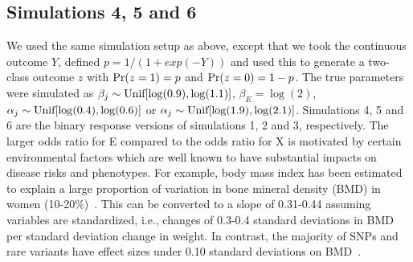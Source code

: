 \begin{comment}
\begin{figure}[h!]
	\centering
	\texttt{[image: figure4.eps]}
	\caption{Visualization of the relationship between the response, the first principal component of the main effects and $f(Q_i)$ in~\eqref{eq:sim3} for $E=0$ (left) and $E=1$ (right) in simulation scenario 3. This graphic also depicts the intuition behind model~\eqref{eq:nonlinear}.}
	\label{fig:sim3-perp}
\end{figure}
\end{comment}



\subsection*{Simulations 4, 5 and 6}
We used the same simulation setup as above, except that we took the continuous outcome $Y$, defined $p = 1/(1+exp(-Y))$ and used this to generate a two-class outcome $z$ with $\textrm{{Pr}}(z=1)=p$ and $\textrm{{Pr}}(z=0)=1-p$. The true parameters were simulated as $\beta_j \sim \textrm{{Unif}}[\log(0.9), \log(1.1)]$, $\beta_E = \log(2)$, $\alpha_j \sim \textrm{{Unif}}[\log(0.4), \log(0.6)]$ or $\alpha_j \sim \textrm{{Unif}}[\log(1.9), \log(2.1)]$. Simulations 4, 5 and 6 are the binary response versions of simulations 1, 2 and 3, respectively. The larger odds ratio for E compared to the odds ratio for X is motivated by certain environmental factors which are well known to have substantial impacts on disease risks and phenotypes. For example, body mass index has been estimated to explain a large proportion of variation in bone mineral density (BMD) in women (10-20\%)~\citep{felson1993effects}. This can be converted to a slope of 0.31-0.44 assuming variables are standardized, i.e., changes of 0.3-0.4 standard deviations in BMD per standard deviation change in weight. In contrast, the majority of SNPs and rare variants have effect sizes under 0.10 standard deviations on BMD~\citep{kemp2017identification}.

